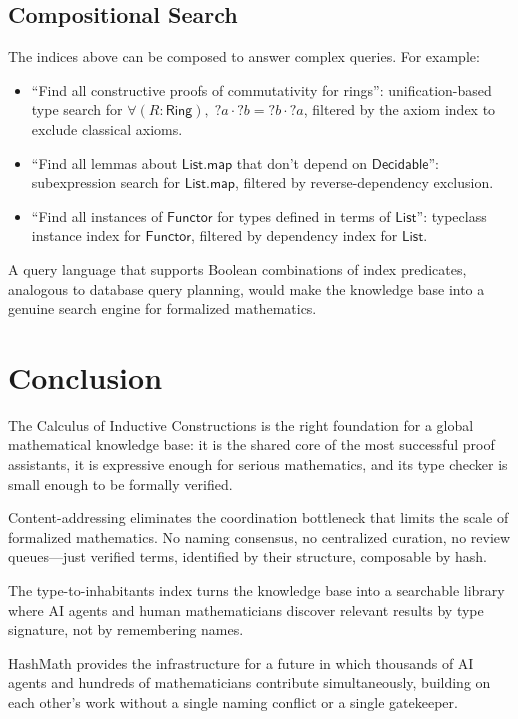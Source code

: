 \documentclass[11pt]{article}
\theoremstyle{definition}
\theoremstyle{plain}
\theoremstyle{remark}
\begin{document}
\subsection{Compositional Search}
\label{sec:compositional}

The indices above can be composed to answer complex queries.
For example:
\begin{itemize}[nosep]
  \item ``Find all constructive proofs of commutativity for rings'':
    unification-based type search for $\forall (R : \textsf{Ring}),\; ?a \cdot ?b = ?b \cdot ?a$,
    filtered by the axiom index to exclude classical axioms.
  \item ``Find all lemmas about $\textsf{List.map}$ that don't depend on $\textsf{Decidable}$'':
    subexpression search for $\textsf{List.map}$, filtered by reverse-dependency exclusion.
  \item ``Find all instances of $\textsf{Functor}$ for types defined in terms of $\textsf{List}$'':
    typeclass instance index for $\textsf{Functor}$, filtered by dependency index for $\textsf{List}$.
\end{itemize}
A query language that supports Boolean combinations of index predicates, analogous to
database query planning, would make the knowledge base into a genuine search engine
for formalized mathematics.


\section{Conclusion}
\label{sec:conclusion}

The Calculus of Inductive Constructions is the right foundation for a global mathematical
knowledge base: it is the shared core of the most successful proof assistants, it is
expressive enough for serious mathematics, and its type checker is small enough to be
formally verified.

Content-addressing eliminates the coordination bottleneck that limits the scale of formalized
mathematics.
No naming consensus, no centralized curation, no review queues---just verified terms,
identified by their structure, composable by hash.

The type-to-inhabitants index turns the knowledge base into a searchable library where
AI agents and human mathematicians discover relevant results by type signature, not by
remembering names.

HashMath provides the infrastructure for a future in which thousands of AI agents and hundreds
of mathematicians contribute simultaneously, building on each other's work without a single
naming conflict or a single gatekeeper.
\end{document}

